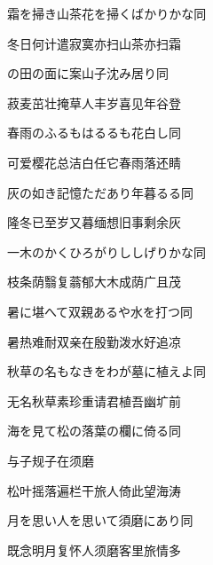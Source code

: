 \begin{haiku}
    {\FH 霜を掃き山茶花を掃くばかりかな}\hfill{\FH 同}

    {\FK 冬日何计遣寂寞亦扫山茶亦扫霜}
\end{haiku}

\begin{haiku}
    {\FH {}の田の面に案山子沈み居り}\hfill{\FH 同}

    {\FK 菽麦茁壮掩草人丰岁喜见年谷登}
\end{haiku}

\begin{haiku}
    {\FH 春雨のふるもはるるも花白し}\hfill{\FH 同}

    {\FK 可爱樱花总洁白任它春雨落还睛}
\end{haiku}

\begin{haiku}
    {\FH 灰の如き記憶ただあり年暮るる}\hfill{\FH 同}

    {\FK 隆冬已至岁又暮缅想旧事剩余灰}
\end{haiku}

\begin{haiku}
    {\FH 一木のかくひろがりししげりかな}\hfill{\FH 同}

    {\FK 枝条荫翳复蓊郁大木成荫广且茂}
\end{haiku}

\begin{haiku}
    {\FH 暑に堪へて双親あるや水を打つ}\hfill{\FH 同}

    {\FK 暑热难耐双亲在殷勤泼水好追凉}
\end{haiku}

\begin{haiku}
    {\FH 秋草の名もなきをわが墓に植えよ}\hfill{\FH 同}

    {\FK 无名秋草素珍重请君植吾幽圹前}
\end{haiku}

\begin{haiku}
    {\FH 海を見て松の落葉の欄に倚る}\hfill{\FH 同}

    {\FK 与子规子在须磨}

    {\FK 松叶摇落遍栏干旅人倚此望海涛}
\end{haiku}

\begin{haiku}
    {\FH 月を思い人を思いて須磨にあり}\hfill{\FH 同}

    {\FK 既念明月复怀人须磨客里旅情多}
\end{haiku}

